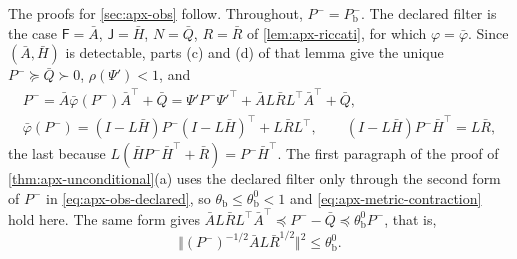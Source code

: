 The proofs for \cref{sec:apx-obs} follow. Throughout, $P^-=P^-_{\mathrm b}$. The declared filter is the case $\mathsf F=\bar A$, $\mathsf J=\bar H$, $N=\bar Q$, $R=\bar R$ of \cref{lem:apx-riccati}, for which $\varphi=\bar\varphi$. Since $(\bar A,\bar H)$ is detectable, parts (c) and (d) of that lemma give the unique $P^-\succeq\bar Q\succ0$, $\rho(\Psi')<1$, and
\begin{equation}\label{eq:apx-obs-declared}
\begin{gathered}
P^-=\bar A\bar\varphi(P^-)\bar A^\top+\bar Q=\Psi'P^-\Psi'^\top+\bar AL\bar RL^\top\bar A^\top+\bar Q,\\
\bar\varphi(P^-)=(I-L\bar H)P^-(I-L\bar H)^\top+L\bar RL^\top,\qquad(I-L\bar H)P^-\bar H^\top=L\bar R ,
\end{gathered}
\end{equation}
the last because $L(\bar HP^-\bar H^\top+\bar R)=P^-\bar H^\top$. The first paragraph of the proof of \cref{thm:apx-unconditional}(a) uses the declared filter only through the second form of $P^-$ in \eqref{eq:apx-obs-declared}, so $\theta_{\mathrm b}\le\theta^0_{\mathrm b}<1$ and \cref{eq:apx-metric-contraction} hold here. The same form gives $\bar AL\bar RL^\top\bar A^\top\preceq P^--\bar Q\preceq\theta^0_{\mathrm b}P^-$, that is,
\begin{equation}\label{eq:apx-obs-gain-norm}
\bigl\Vert(P^-)^{-1/2}\bar AL\bar R^{1/2}\bigr\Vert^2\le\theta^0_{\mathrm b} .
\end{equation}

